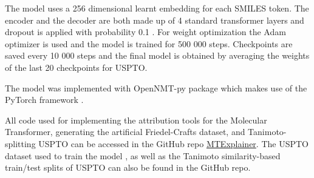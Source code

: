 The model uses a 256 dimensional learnt embedding for each SMILES token. The encoder and the decoder are both made up of 4 standard transformer layers and dropout is applied with probability 0.1 \cite{Srivastava2014Dropout:Overfittin}. For weight optimization the Adam optimizer is used and the model is trained for 500 000 steps. Checkpoints are saved every 10 000 steps and the final model is obtained by averaging the weights of the last 20 checkpoints for USPTO.

The model was implemented with OpenNMT-py package \cite{Klein2017} which makes use of the PyTorch framework \cite{Paszke2019PyTorch:Library}. 

All code used for implementing the attribution tools for the Molecular Transformer, generating the artificial Friedel-Crafts dataset, and Tanimoto-splitting USPTO can be accessed in the GitHub repo \href{https://github.com/davkovacs/MTExplainer.git}{MTExplainer}\cite{Kovacs2020MolecularExplainer}. The USPTO dataset used to train the model \cite{Lowe2012, Jin2017}, as well as the Tanimoto similarity-based train/test splits of USPTO can also be found in the GitHub repo.